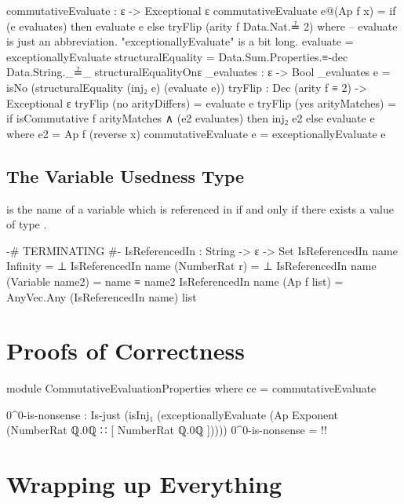 \documentclass{report}
\begin{document}
\begin{code}
commutativeEvaluate : ε -> Exceptional ε
commutativeEvaluate e@(Ap f x) =
  if (e evaluates) then evaluate e else tryFlip (arity f Data.Nat.≟ 2)
  where
  -- evaluate is just an abbreviation.  "exceptionallyEvaluate" is a bit long.
  evaluate = exceptionallyEvaluate
  structuralEquality =
    Data.Sum.Properties.≡-dec Data.String._≟_ structuralEqualityOnε
  _evaluates : ε -> Bool
  _evaluates e = isNo (structuralEquality (inj₂ e) (evaluate e))
  tryFlip : Dec (arity f ≡ 2) -> Exceptional ε
  tryFlip (no arityDiffers) = evaluate e
  tryFlip (yes arityMatches) =
    if isCommutative f arityMatches ∧ (e2 evaluates) then inj₂ e2 else evaluate e
    where e2 = Ap f (reverse x)
commutativeEvaluate e = exceptionallyEvaluate e
\end{code}

\section{The Variable Usedness Type}
 is the name of a variable which is referenced in  if and only if there exists a value of type   .

\begin{code}
{-# TERMINATING #-}
IsReferencedIn : String -> ε -> Set
IsReferencedIn name Infinity = ⊥
IsReferencedIn name (NumberRat r) = ⊥
IsReferencedIn name (Variable name2) = name ≡ name2
IsReferencedIn name (Ap f list) = AnyVec.Any (IsReferencedIn name) list
\end{code}

\chapter{Proofs of Correctness}

\begin{code}
module CommutativeEvaluationProperties where
  ce = commutativeEvaluate

  0^0-is-nonsense :
    Is-just (isInj₁ (exceptionallyEvaluate
      (Ap Exponent (NumberRat ℚ.0ℚ ∷ [ NumberRat ℚ.0ℚ ]))))
  0^0-is-nonsense = {!!}
\end{code}

\chapter{Wrapping up Everything}
\end{document}
